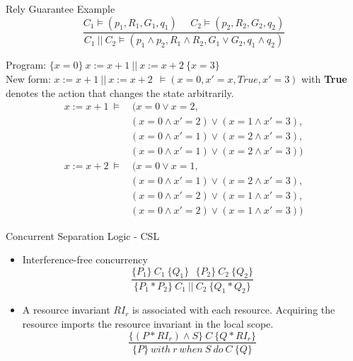 \documentclass[11pt]{beamer}
\begin{document}
\begin{frame}{Rely Guarantee Example}
     $$\frac{C_1 \models (p_1, R_1,G_1,q_1)~~~~~~ C_2 \models (p_2, R_2, G_2,
    q_2)}{C_1~||~C_2 \models (p_1 \land 
    p_2, R_1 \land R_2, G_1 \lor G_2, q_1 \land q_2)}$$
 
  Program: $\{x = 0\}~ x := x + 1 ~||~ x := x + 2 ~\{x = 3\}$ \\
  New form: $x := x + 1 ~||~ x := x + 2~~\models (x=0, x' = x, True, x' = 3)$
  with \textbf{True} denotes the action that changes the state arbitrarily. 
    \pause
  \begin{equation}
    \begin{split}
      x := x + 1 ~\models &~(x = 0 \lor x = 2, \\
      &(x = 0 \land x' = 2) \lor (x = 1 \land x' = 3), \\
      &(x = 0 \land x'=1) \lor (x=2 \land x' = 3), \\
      &(x = 0 \land x' = 1) \lor (x = 2 \land x' = 3)) \nonumber
  \end{split}
  \end{equation}
  \pause
  \begin{equation}
    \begin{split}
      x := x + 2 ~\models &~(x = 0 \lor x = 1, \\
      &(x = 0 \land x' = 1) \lor (x = 2 \land x' = 3), \\
      &(x = 0 \land x'= 2) \lor (x=1 \land x' = 3), \\
      &(x = 0 \land x' = 2) \lor (x = 1 \land x' = 3)) \nonumber
  \end{split}
  \end{equation}
\end{frame}


\begin{frame}{Concurrent Separation Logic - CSL}
  \begin{itemize}
  \item Interference-free concurrency
    $$\frac{\{P_1\}~C_1~\{Q_1\}~~~\{P_2\}~C_2~\{Q_2\}}{\{P_1 \ast P_2\}~C_1~||~C_2 ~\{Q_1 \ast Q_2
    \}}$$
    \pause
  \item A resource invariant $RI_r$ is associated with each resource. Acquiring
    the resource imports the resource invariant in the local scope.
    $$\frac{\{(P \ast RI_r) \land S\}~C~\{Q \ast RI_r\}}{\{P\}~with~r~when~S~do~C~\{Q\}}$$
  \end{itemize}
\end{frame}
\end{document}
